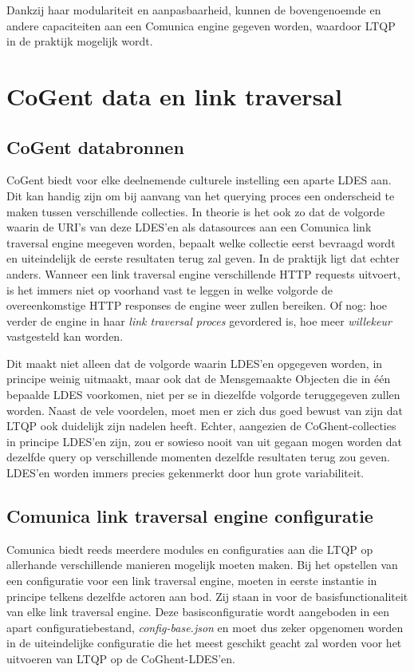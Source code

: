 \documentclass[conference]{IEEEtran}
\begin{document}
Dankzij haar modulariteit en aanpasbaarheid, kunnen de bovengenoemde en andere capaciteiten aan een Comunica engine gegeven worden, waardoor LTQP in de praktijk mogelijk wordt. \cite{taelman2018comunica} \cite{taelman2019lt}

\section{CoGent data en link traversal}

\subsection{CoGent databronnen}
CoGent biedt voor elke deelnemende culturele instelling een aparte LDES aan. Dit kan handig zijn om bij aanvang van het querying proces een onderscheid te maken tussen verschillende collecties. In theorie is het ook zo dat de volgorde waarin de URI's van deze LDES'en als datasources aan een Comunica link traversal engine meegeven worden, bepaalt welke collectie eerst bevraagd wordt en uiteindelijk de eerste resultaten terug zal geven. In de praktijk ligt dat echter anders. Wanneer een link traversal engine verschillende HTTP requests uitvoert, is het immers niet op voorhand vast te leggen in welke volgorde de overeenkomstige HTTP responses de engine weer zullen bereiken. Of nog: hoe verder de engine in haar \textit{link traversal proces} gevordered is, hoe meer \textit{willekeur} vastgesteld kan worden.

Dit maakt niet alleen dat de volgorde waarin LDES'en opgegeven worden, in principe weinig uitmaakt, maar ook dat de Mensgemaakte Objecten die in één bepaalde LDES voorkomen, niet per se in diezelfde volgorde teruggegeven zullen worden. Naast de vele voordelen, moet men er zich dus goed bewust van zijn dat LTQP ook duidelijk zijn nadelen heeft. Echter, aangezien de CoGhent-collecties in principe LDES'en zijn, zou er sowieso nooit van uit gegaan mogen worden dat dezelfde query op verschillende momenten dezelfde resultaten terug zou geven. LDES'en worden immers precies gekenmerkt door hun grote variabiliteit.

\subsection{Comunica link traversal engine configuratie}
Comunica biedt reeds meerdere modules en configuraties aan die LTQP op allerhande verschillende manieren mogelijk moeten maken. Bij het opstellen van een configuratie voor een link traversal engine, moeten in eerste instantie in principe telkens dezelfde actoren aan bod. Zij staan in voor de basisfunctionaliteit van elke link traversal engine. Deze basisconfiguratie wordt aangeboden in een apart configuratiebestand, \textit{config-base.json} en moet dus zeker opgenomen worden in de uiteindelijke configuratie die het meest geschikt geacht zal worden voor het uitvoeren van LTQP op de CoGhent-LDES'en.
\end{document}
